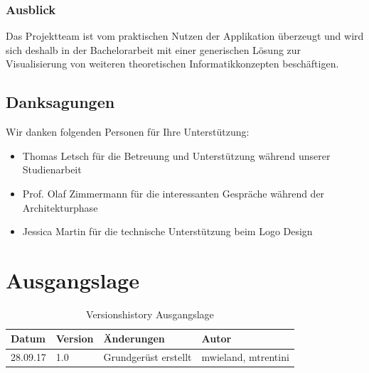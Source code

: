 \documentclass[11pt,a4paper,english,oneside]{book}
\numberwithin{equation}{chapter}
\begin{document}
	\subsection*{Ausblick}
	Das Projektteam ist vom praktischen Nutzen der Applikation überzeugt und wird sich deshalb in der Bachelorarbeit mit einer generischen Lösung zur Visualisierung von weiteren theoretischen Informatikkonzepten beschäftigen.
	
	\newpage
	
	\section*{Danksagungen}
	\thispagestyle{firststyle}
	
	Wir danken folgenden Personen für Ihre Unterstützung:
	
	\begin{itemize}
		\item Thomas Letsch für die Betreuung und Unterstützung während unserer Studienarbeit
		\item Prof. Olaf Zimmermann für die interessanten Gespräche während der Architekturphase
		\item Jessica Martin für die technische Unterstützung beim Logo Design
	\end{itemize}
	

	{
		\hypersetup{linkcolor=black}
		\tableofcontents
	}

	\newpage
	
	
	\chapter{Ausgangslage}
	
	\begin{table}[h!]
		\centering
		\begin{tabularx}{\linewidth}{l l X l}
			\toprule 
			Datum & Version & Änderungen & Autor \\
			\midrule
			28.09.17 & 1.0 & Grundgerüst erstellt & mwieland, mtrentini \\
			\bottomrule 
		\end{tabularx} 
		\caption{Versionshistory Ausgangslage} 
	\end{table}
	
	
\end{document}
